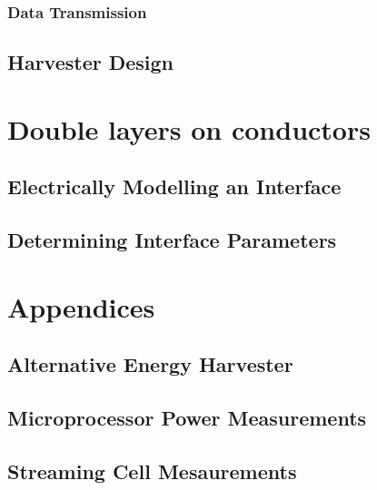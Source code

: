         \section{Data Transmission}
            

    \chapter{Harvester Design}
        \label{chap:harvesterDesign}
        

\part{\label{part:doubleLayersOnConductors}Double layers on conductors}
    \chapter{Electrically Modelling an Interface}
        
    \chapter{Determining Interface Parameters}
        

\part{Appendices}
    \appendix
    \chapter{Alternative Energy Harvester}
        
    \chapter{Microprocessor Power Measurements}
        
    \chapter{Streaming Cell Mesaurements}
        







